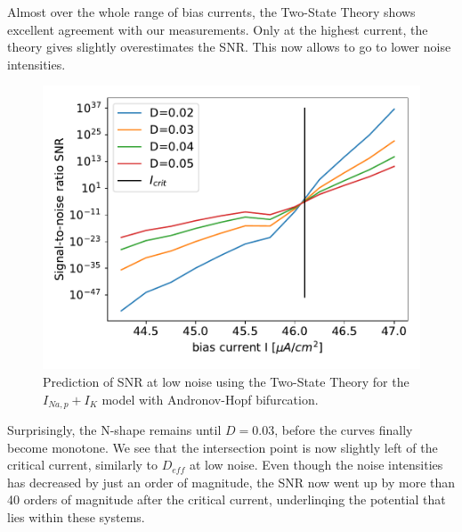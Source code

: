 \documentclass[12pt,a4paper]{article}
\begin{document}
Almost over the whole range of bias currents, the Two-State Theory shows excellent agreement with our measurements. Only at the highest current, the theory gives slightly overestimates the SNR. This now allows to go to lower noise intensities.
\begin{figure}[H]
	\centering
	\includegraphics[scale=1]{snranhopfpred.pdf}\caption{Prediction of SNR at low noise  using the Two-State Theory for the $I_{Na,p}+I_K$ model with Andronov-Hopf bifurcation.}
	\label{snrpredanhopf}
\end{figure}
Surprisingly, the N-shape remains until $D=0.03$, before the curves finally become monotone. We see that the intersection point is now slightly left of the critical current, similarly to $D_{eff}$ at low noise. Even though the noise intensities has decreased by just an order of magnitude, the SNR now went up by more than 40 orders of magnitude after the critical current, underlinqing the potential that lies within these systems.
\end{document}
